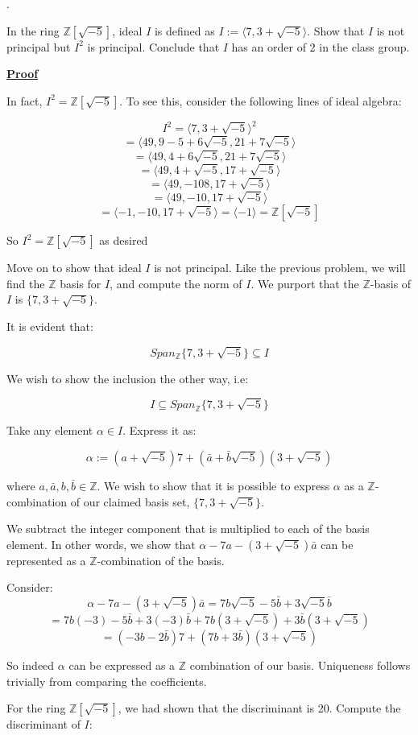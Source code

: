 \documentclass{article}
\def\ZZ{{\mathbb{Z}}}
\newcounter{problemcnt}
\newcommand{\Problem}{{
    \vspace{5mm}
    \stepcounter{problemcnt}
    \noindent
    \arabic{problemcnt}. 
}
}
\newcommand{\Proof}{{
    \vspace{2mm}
    \noindent
    \textbf{
    \underline{Proof}}
}
}
\newcommand{\<}{{{
    \langle
}}}
\def\>{{{
    \rangle
}}}
\def\ZZ{{\mathbb{Z}}}
\begin{document}
\newpage

\Problem
In the ring $\ZZ[\sqrt{-5}]$, ideal $I$ is defined as 
$I := \<7, 3+\sqrt{-5}\>$. Show that $I$ is not principal 
but $I^2$ is principal. Conclude that $I$ has an order of 2 
in the class group. 

\Proof
In fact, $I^2 = \ZZ[\sqrt{-5}]$. To see this, consider 
the following lines of ideal algebra:

\[
    I^2 = \<7, 3+\sqrt{-5}\>^2
\]
\[
    = \<49, 9-5+6\sqrt{-5}, 21+7\sqrt{-5}\>
\]
\[
  = \<49, 4+6\sqrt{-5}, 21+7\sqrt{-5}\>
\]
\[
    = \<49, 4+\sqrt{-5}, 17+\sqrt{-5}\>
\]
\[
    =\<49, -108, 17+\sqrt{-5}\>
\]
\[
    =\<49, -10, 17+\sqrt{-5}\>
\]
\[
    =\<-1, -10, 17+\sqrt{-5}\> = \<-1\> = \ZZ[\sqrt{-5}]
\]

So $I^2 = \ZZ[\sqrt{-5}]$ as desired \checkmark

Move on to show that ideal $I$ is not principal. 
Like the previous problem, we will find the $\ZZ$ basis for 
$I$, and compute the norm of $I$. We purport that 
the $\ZZ$-basis of $I$ is $\{7, 3+\sqrt{-5}\}$. 

It is evident that:

\[
    Span_{\ZZ}\{7, 3+\sqrt{-5}\} \subseteq I
\]

We wish to show the inclusion the other way, i.e:

\[
    I \subseteq Span_{\ZZ}\{7, 3+\sqrt{-5}\} 
\]

Take any element $\alpha \in I$. Express it as:

\[
    \alpha := (a+\sqrt{-5})7 + (\bar{a}+\bar{b}\sqrt{-5})(3+\sqrt{-5})
\]

where $a, \bar{a}, b, \bar{b} \in \ZZ$. We wish to 
show that it is possible to express $\alpha$ as a $\ZZ$-combination 
of our claimed basis set, $\{7, 3+\sqrt{-5}\}$.

We subtract the integer component that is multiplied 
to each of the basis element. In other words, 
we show that $\alpha -7a - (3+\sqrt{-5})\bar{a}$ can 
be represented as a $\ZZ$-combination of the basis.

Consider:
\[
\alpha -7a - (3+\sqrt{-5})\bar{a}
=7b{\sqrt{-5}}-5\bar{b}+3\sqrt{-5}\bar{b}
\]
\[
    = 7b(-3)-5\bar{b}+3(-3)\bar{b}
    +7b(3+\sqrt{-5})+3\bar{b}(3+\sqrt{-5})
\]
\[
    =(-3b-2\bar{b})7+(7b+3\bar{b})(3+\sqrt{-5})
\]

So indeed $\alpha$ can be expressed as a $\ZZ$ combination of 
our basis. Uniqueness follows trivially from comparing the coefficients. 

For the ring $\ZZ[\sqrt{-5}]$, we had shown that the discriminant is 20. 
Compute the discriminant of $I$:
\end{document}
